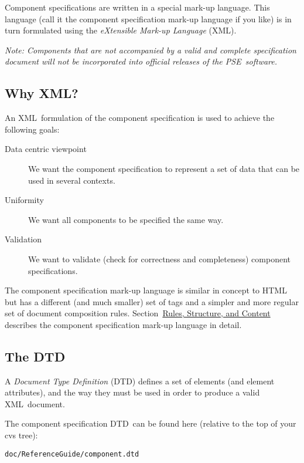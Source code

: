 \documentclass{article}
\newcommand{\acronym}[1]{#1}
\newcommand{\dfn}[1]{\emph{#1}}
\newcommand{\xml}{\acronym{XML}}
\newcommand{\dtd}{\acronym{DTD}}
\newcommand{\pse}{\acronym{PSE}}
\newcommand{\sectitle}[1]{\emph{#1}}
\newcommand{\sechyperref}[1]{\hyperref{\sectitle{#1}}{}{}{#1}}
\newcommand{\Note}[1]{\emph{Note: #1}}
\newcommand{\SUBSECwhyXml}{Why XML?}
\newcommand{\SUBSECwhatDtd}{The DTD}
\newcommand{\SECcontent}{Rules, Structure, and Content}
\begin{document}
Component specifications are written in a special mark-up language.  This
language (call it the component specification mark-up language if you
like) is in turn formulated using the \dfn{eXtensible Mark-up Language}
(\xml).

\Note{Components that are not accompanied by a valid and complete
  specification document will not be incorporated into official
  releases of the \pse\ software.}

\subsection{\SUBSECwhyXml}
\label{\SUBSECwhyXml}

An \xml\ formulation of the component specification is used to achieve
the following goals:

\begin{description}
\item[Data centric viewpoint] We want the component specification to represent
  a set of data that can be used in several contexts.

\item[Uniformity] We want all components to be specified the same way.

\item[Validation] We want to validate (check for correctness and
  completeness) component specifications.
\end{description}

The component specification mark-up language is similar in concept to HTML but
has a different (and much smaller) set of tags and a simpler and more
regular set of document composition rules.
Section~\sechyperref{\SECcontent} describes
the component specification mark-up language in detail.

\subsection{\SUBSECwhatDtd}
\label{\SUBSECwhatDtd}

A \dfn{Document Type Definition} (\dtd) defines a set of elements (and
element attributes), and the way they must be used in order to produce a
valid \xml\ document.

The component specification \dtd\ can be found here (relative to the top
of your cvs tree):

\begin{verbatim}
doc/ReferenceGuide/component.dtd
\end{verbatim}
\end{document}
